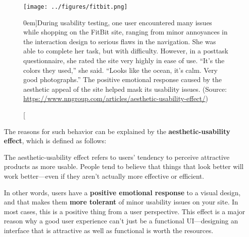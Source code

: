 \begin{figure}%
  \texttt{[image: ../figures/fitbit.png]}
  \caption[][0em]{During usability testing, one user encountered many issues while shopping on the FitBit site, ranging from minor annoyances in the interaction design to serious flaws in the navigation. She was able to complete her task, but with difficulty. However, in a posttask questionnaire, she rated the site very highly in ease of use. ``It’s the colors they used,'' she said. ``Looks like the ocean, it’s calm. Very good photographs.'' The positive emotional response caused by the aesthetic appeal of the site helped mask its usability issues. (Source: \url{https://www.nngroup.com/articles/aesthetic-usability-effect/})}
  \label{fig:fitbit}
\end{figure}

The reasons for such behavior can be explained by the \textbf{aesthetic-usability effect}, which is defined as follows:

\begin{tcolorbox}[
	width=\textwidth,
	title={\textbf{Definition: Aesthetic-Usability Effect}},
	outer arc=0mm,
	arc=0mm,
	boxrule=1pt,
	]    
The aesthetic-usability effect refers to users’ tendency to perceive attractive products as more usable. People tend to believe that things that look better will work better---even if they aren’t actually more effective or efficient.
\end{tcolorbox}

In other words, users have a \textbf{positive emotional response} to a visual design, and that makes them \textbf{more tolerant} of minor usability issues on your site. In most cases, this is a positive thing from a user perspective. This effect is a major reason why a good user experience can’t just be a functional UI---designing an interface that is attractive as well as functional is worth the resources.

